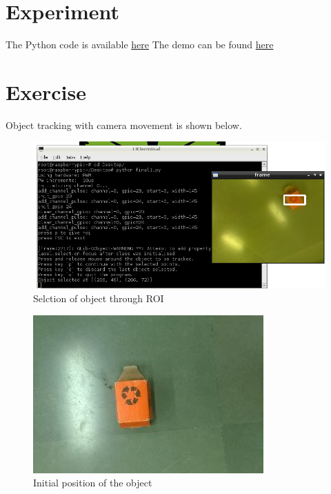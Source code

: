 \documentclass[11pt,a4paper]{article}
\begin{document}
	\section{Experiment}
	The Python code is available \href{https://github.com/eYSIP-2016/Object-Tracking-Camera/tree/master/Tutorials/6.%20Object%20%20Tracking%20using%20a%20Pi-Cam%20interfaced%20on%20a%20Raspberry-Pi/Code}{here} 
	\newline
	The demo can be found \href{https://youtu.be/8CXhzPhfl64}{here}
  	
 \newpage
	\section{Exercise}
	Object tracking with camera movement is shown below.
	\begin{figure}[h!]
     \includegraphics[scale=0.6]{1.png}
   \centering
 \caption{Selction of object through ROI}
  \end{figure}
  \begin{figure}[h]
 \includegraphics[scale=0.6]{s1.jpg}
   \centering
 \caption{Initial position of the object}
  \end{figure}
\end{document}
